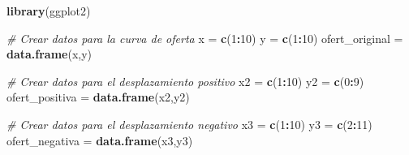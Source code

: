 \documentclass[
  spanish,
  12pt,
]{book}
\newenvironment{Shaded}{\begin{snugshade}}{\end{snugshade}}
\newcommand{\CommentTok}[1]{\textcolor[rgb]{0.56,0.35,0.01}{\textit{#1}}}
\newcommand{\DecValTok}[1]{\textcolor[rgb]{0.00,0.00,0.81}{#1}}
\newcommand{\FunctionTok}[1]{\textcolor[rgb]{0.13,0.29,0.53}{\textbf{#1}}}
\newcommand{\NormalTok}[1]{#1}
\newcommand{\OtherTok}[1]{\textcolor[rgb]{0.56,0.35,0.01}{#1}}
\newcommand{\SpecialCharTok}[1]{\textcolor[rgb]{0.81,0.36,0.00}{\textbf{#1}}}
\begin{document}
\begin{Shaded}
\begin{Highlighting}[]
\FunctionTok{library}\NormalTok{(ggplot2)}

\CommentTok{\# Crear datos para la curva de oferta}
\NormalTok{x }\OtherTok{=} \FunctionTok{c}\NormalTok{(}\DecValTok{1}\SpecialCharTok{:}\DecValTok{10}\NormalTok{)}
\NormalTok{y }\OtherTok{=} \FunctionTok{c}\NormalTok{(}\DecValTok{1}\SpecialCharTok{:}\DecValTok{10}\NormalTok{)}
\NormalTok{ofert\_original }\OtherTok{=} \FunctionTok{data.frame}\NormalTok{(x,y)}

\CommentTok{\# Crear datos para el desplazamiento positivo}
\NormalTok{x2 }\OtherTok{=} \FunctionTok{c}\NormalTok{(}\DecValTok{1}\SpecialCharTok{:}\DecValTok{10}\NormalTok{)}
\NormalTok{y2 }\OtherTok{=} \FunctionTok{c}\NormalTok{(}\DecValTok{0}\SpecialCharTok{:}\DecValTok{9}\NormalTok{)}
\NormalTok{ofert\_positiva }\OtherTok{=} \FunctionTok{data.frame}\NormalTok{(x2,y2)}

\CommentTok{\# Crear datos para el desplazamiento negativo}
\NormalTok{x3 }\OtherTok{=} \FunctionTok{c}\NormalTok{(}\DecValTok{1}\SpecialCharTok{:}\DecValTok{10}\NormalTok{)}
\NormalTok{y3 }\OtherTok{=} \FunctionTok{c}\NormalTok{(}\DecValTok{2}\SpecialCharTok{:}\DecValTok{11}\NormalTok{)}
\NormalTok{ofert\_negativa }\OtherTok{=} \FunctionTok{data.frame}\NormalTok{(x3,y3)}


\end{Highlighting}
\end{Shaded}
\end{document}
